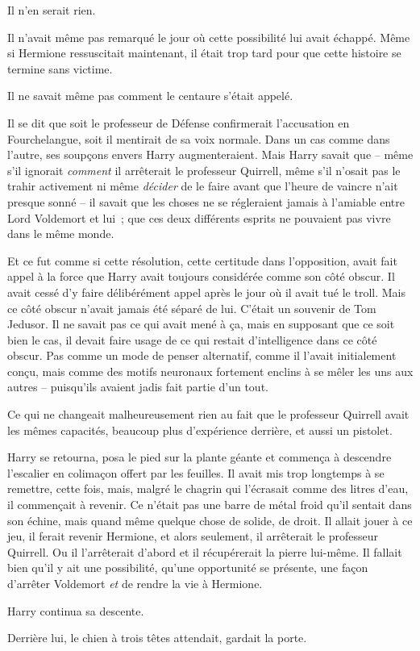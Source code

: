 Il n'en serait rien.

Il n'avait même pas remarqué le jour où cette possibilité lui avait échappé.
Même si Hermione ressuscitait maintenant, il était trop tard pour que cette histoire se termine sans victime.

Il ne savait même pas comment le centaure s'était appelé.

Il se dit que soit le professeur de Défense confirmerait l'accusation en Fourchelangue, soit il mentirait de sa voix normale.
Dans un cas comme dans l'autre, ses soupçons envers Harry augmenteraient.
Mais Harry savait que -- même s'il ignorait \emph{comment} il arrêterait le professeur Quirrell, même s'il n'osait pas le trahir activement ni même \emph{décider} de le faire avant que l'heure de vaincre n'ait presque sonné -- il savait que les choses ne se régleraient jamais à l'amiable entre Lord Voldemort et lui~; que ces deux différents esprits ne pouvaient pas vivre dans le même monde.

Et ce fut comme si cette résolution, cette certitude dans l'opposition, avait fait appel à la force que Harry avait toujours considérée comme son côté obscur.
Il avait cessé d'y faire délibérément appel après le jour où il avait tué le troll.
Mais ce côté obscur n'avait jamais été séparé de lui.
C'était un souvenir de Tom Jedusor.
Il ne savait pas ce qui avait mené à ça, mais en supposant que ce soit bien le cas, il devait faire usage de ce qui restait d'intelligence dans ce côté obscur.
Pas comme un mode de penser alternatif, comme il l'avait initialement conçu, mais comme des motifs neuronaux fortement enclins à se mêler les uns aux autres -- puisqu'ils avaient jadis fait partie d'un tout.

Ce qui ne changeait malheureusement rien au fait que le professeur Quirrell avait les mêmes capacités, beaucoup plus d'expérience derrière, et aussi un pistolet.

Harry se retourna, posa le pied sur la plante géante et commença à descendre l'escalier en colimaçon offert par les feuilles.
Il avait mis trop longtemps à se remettre, cette fois, mais, malgré le chagrin qui l'écrasait comme des litres d'eau, il commençait à revenir.
Ce n'était pas une barre de métal froid qu'il sentait dans son échine, mais quand même quelque chose de solide, de droit.
Il allait jouer à ce jeu, il ferait revenir Hermione, et alors seulement, il arrêterait le professeur Quirrell.
Ou il l'arrêterait d'abord et il récupérerait la pierre lui-même.
Il fallait bien qu'il y ait une possibilité, qu'une opportunité se présente, une façon d'arrêter Voldemort \emph{et} de rendre la vie à Hermione.

Harry continua sa descente.

Derrière lui, le chien à trois têtes attendait, gardait la porte.
